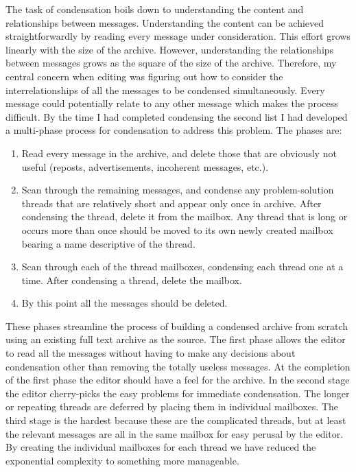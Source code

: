 The task of condensation boils down to understanding the content and
relationships between messages. Understanding the content can be achieved
straightforwardly by reading every message under consideration. This effort
grows linearly with the size of the archive. However, understanding the
relationships between messages grows as the square of the size of the archive.
Therefore, my central concern when editing was figuring out how to consider the
interrelationships of all the messages to be condensed simultaneously. Every
message could potentially relate to any other message which makes the process
difficult. By the time I had completed condensing the second list I had
developed a multi-phase process for condensation to address this problem. The
phases are:

\begin{enumerate}
\item Read every message in the archive, and delete those that are obviously
  not useful (reposts, advertisements, incoherent messages, etc.).
\item Scan through the remaining messages, and condense any problem-solution
  threads that are relatively short and appear only once in archive. After
  condensing the thread, delete it from the mailbox. Any thread that is long or
  occurs more than once should be moved to its own newly created mailbox
  bearing a name descriptive of the thread.
\item Scan through each of the thread mailboxes, condensing each thread one at
  a time. After condensing a thread, delete the mailbox.
\item By this point all the messages should be deleted.
\end{enumerate}

These phases streamline the process of building a condensed archive from
scratch using an existing full text archive as the source. The first phase
allows the editor to read all the messages without having to make any decisions
about condensation other than removing the totally useless messages. At the
completion of the first phase the editor should have a feel for the archive. In
the second stage the editor cherry-picks the easy problems for immediate
condensation. The longer or repeating threads are deferred by placing them in
individual mailboxes. The third stage is the hardest because these are the
complicated threads, but at least the relevant messages are all in the same
mailbox for easy perusal by the editor. By creating the individual mailboxes
for each thread we have reduced the exponential complexity to something more
manageable.

